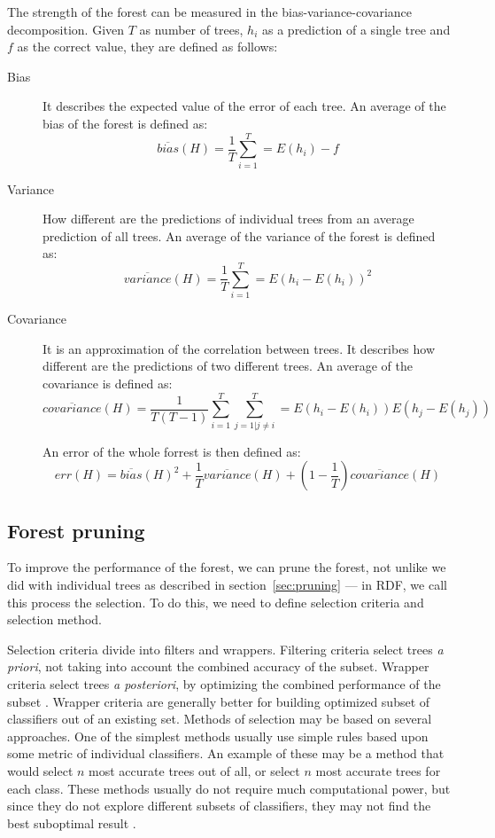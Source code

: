 \documentclass[thesis=B,english]{FITthesis}[2012/10/20]
\begin{document}
	The strength of the forest can be measured in the bias-variance-covariance decomposition. Given \(T\) as number of trees, \(h_i\) as a prediction of a single tree and \(f\) as the correct value, they are defined as follows:
	\begin{description}
	\item[Bias] It describes the expected value of the error of each tree. An average of the bias of the forest is defined as:
	\[
	\overline{\textit{bias}}(H) = \frac{1}{T}\sum_{i=1}^T=E(h_i)-f
	\]
	\item[Variance] How different are the predictions of individual trees from an average prediction of all trees. An average of the variance of the forest is defined as:
	\[
	\overline{\textit{variance}}(H) = \frac{1}{T}\sum_{i=1}^T=E(h_i-E(h_i))^2
	\]
	\item[Covariance] It is an approximation of the correlation between trees. It describes how different are the predictions of two different trees. An average of the covariance is defined as:
	\[
	\overline{\textit{covariance}}(H) = \frac{1}{T(T-1)}\sum_{i=1}^T\sum_{j=1|j \neq i}^T=E(h_i-E(h_i))E(h_j-E(h_j))
	\]
 	
	An error of the whole forrest is then defined as: 
	\[
	\textit{err}(H)=\overline{\textit{bias}}(H)^2 + \frac{1}{T}\overline{\textit{variance}}(H) + \left(1 - \frac{1}{T}\right)\overline{\textit{covariance}}(H)
	\]

	\end{description}

	\subsection{Forest pruning}
	To improve the performance of the forest, we can prune the forest, not unlike we did with individual trees as described in section~\ref{sec:pruning} --- in RDF, we call this process the selection. To do this, we need to define selection criteria and selection method.

	Selection criteria divide into filters and wrappers. Filtering criteria select trees \textit{a priori}, not taking into account the combined accuracy of the subset. Wrapper criteria select trees \textit{a posteriori}, by optimizing the combined performance of the subset \cite{PRUNING_RDF}. Wrapper criteria are generally better for building optimized subset of classifiers out of an existing set. Methods of selection may be based on several approaches.
	One of the simplest methods usually use simple rules based upon some metric of individual classifiers. An example of these may be a method that would select \(n\) most accurate trees out of all, or select \(n\) most accurate trees for each class. These methods usually do not require much computational power, but since they do not explore different subsets of classifiers, they may not find the best suboptimal result \cite{PRUNING_RDF}. 
	
\end{document}
